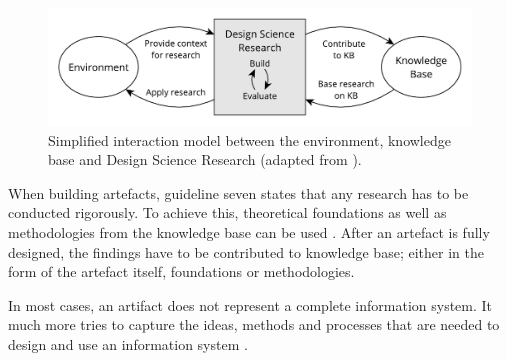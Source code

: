 \begin{figure}[H]
\begin{center}
  \includegraphics[scale=0.7]{images/figures/design_science_cycles.pdf}
\end{center}
\caption[Simplified interaction model between the environment, knowledge base and Design Science Research.]{Simplified interaction model between the environment, knowledge base and Design Science Research (adapted from \autocite[p. 88]{HevnerThreeCycleView2007}).}
\label{fig:design_science_cycles}
\end{figure}

When building artefacts, guideline seven states that any research has to be
conducted rigorously. To achieve this, theoretical foundations as well as
methodologies from the knowledge base can be used \autocite[p.
88]{VonAlanDesignscienceinformation2004}. After an artefact is fully designed,
the findings have to be contributed to knowledge base; either in the form of
the artefact itself, foundations or methodologies.

In most cases, an artifact does not represent a complete information system. It
much more tries to capture the ideas, methods and processes that are needed to
design and use an information system \autocite[p.
83]{VonAlanDesignscienceinformation2004}.

